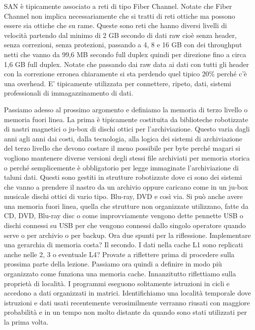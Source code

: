 SAN è tipicamente associato a reti di tipo Fiber Channel.
Notate che Fiber Channel non implica necessariamente che si tratti di reti ottiche ma possono essere sia ottiche che su rame.
Queste sono reti che hanno diversi livelli di velocità partendo dal minimo di 2 GB secondo di dati raw cioè senza header, senza correzioni, senza protezioni, passando a 4, 8 e 16 GB con dei throughput netti che vanno da 99,6 MB secondo full duplex quindi per direzione fino a circa 1,6 GB full duplex.
Notate che passando dai raw data ai dati con tutti gli header con la correzione erronea chiaramente si sta perdendo quel tipico 20\% perché c'è una overhead.
E' tipicamente utilizzata per connettere, ripeto, dati, sistemi professionali di immagazzinamento di dati.


Passiamo adesso al prossimo argomento e definiamo la memoria di terzo livello o memoria fuori linea.
La prima è tipicamente costituita da biblioteche robotizzate di nastri magnetici o ju-box di dischi ottici per l'archiviazione.
Questo varia dagli anni agli anni dai costi, dalla tecnologia, alla logica dei sistemi di archiviazione del terzo livello che devono costare il meno possibile per byte perché magari si vogliono mantenere diverse versioni degli stessi file archiviati per memoria storica o perché semplicemente è obbligatorio per legge immaginate l'archiviazione di taluni dati.
Questi sono gestiti in strutture robotizzate dove ci sono dei sistemi che vanno a prendere il nastro da un archivio oppure caricano come in un ju-box musicale dischi ottici di vario tipo.
Blu-ray, DVD e così via.
Si può anche avere una memoria fuori linea, quella che strutture non organizzate utilizzano, fatte da CD, DVD, Blu-ray disc o come improvviamente vengono dette pennette USB o dischi connessi su USB per che vengono connessi dallo singolo operatore quando serve o per archivio o per backup.
Ora due spunti per la riflessione.
Implementare una gerarchia di memoria costa?
Il secondo.
I dati nella cache L1 sono replicati anche nelle 2, 3 o eventuale L4?
Provate a riflettere prima di procedere sulla prossima parte della lezione.
Passiamo ora quindi a definire in modo più organizzato come funziona una memoria cache.
Innanzitutto riflettiamo sulla proprietà di località.
I programmi eseguono solitamente istruzioni in cicli e accedono a dati organizzati in matrici.
Identifichiamo una località temporale dove istruzioni e dati usati recentemente verosimilmente verranno riusati con maggiore probabilità e in un tempo non molto distante da quando sono stati utilizzati per la prima volta.
